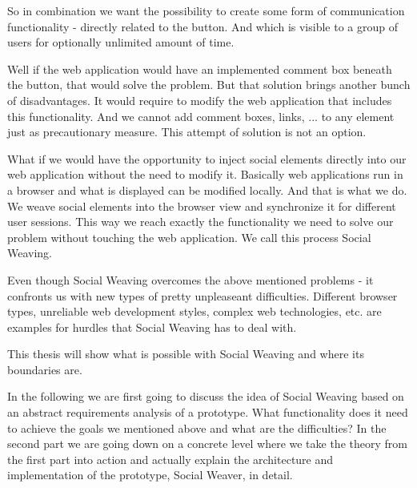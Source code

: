 So in combination we want the possibility to create some form of communication functionality - directly related to the button. And which is visible to a group of users for optionally unlimited amount of time.

Well if the web application would have an implemented comment box beneath the button, that would solve the problem. But that  solution brings another bunch of disadvantages. It would require to modify the web application that includes this functionality. And we cannot add comment boxes, links, ... to any element just as precautionary measure. This attempt of solution is not an option. 

What if we would have the opportunity to inject social elements directly into our web application without the need to modify it. Basically web applications run in a browser and what is displayed can be modified locally. And that is what we do. We weave social elements into the browser view and synchronize it for different user sessions. This way we reach exactly the functionality we need to solve our problem without touching the web application. We call this process Social Weaving. 

Even though Social Weaving overcomes the above mentioned problems - it confronts us with new types of pretty unpleaseant difficulties. Different browser types, unreliable web development styles, complex web technologies, etc. are examples for hurdles that Social Weaving has to deal with. 

This thesis will show what is possible with Social Weaving and where its boundaries are. 

In the following we are first going to discuss the idea of Social Weaving based on  an abstract requirements analysis of a prototype. What functionality does it need to achieve the goals we mentioned above and what are the difficulties? In the second part we are going down on a concrete level where we take the theory from the first part into action and actually explain the architecture and implementation of the prototype, Social Weaver, in detail. 